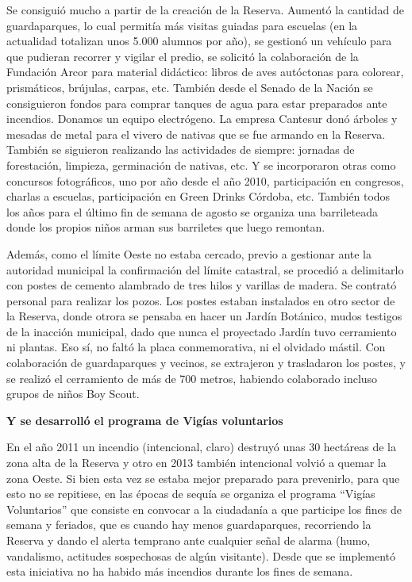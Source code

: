\begin{fullwidth}
Se consiguió mucho a partir de la creación de la Reserva. Aumentó la
cantidad de guardaparques, lo cual permitía más visitas guiadas para
escuelas (en la actualidad totalizan unos 5.000 alumnos por año), se
gestionó un vehículo para que pudieran recorrer y vigilar el predio, se
solicitó la colaboración de la Fundación Arcor para material didáctico:
libros de aves autóctonas para colorear, prismáticos, brújulas, carpas,
etc. También desde el Senado de la Nación se consiguieron fondos para
comprar tanques de agua para estar preparados ante incendios. Donamos un
equipo electrógeno. La empresa Cantesur donó árboles y mesadas de metal
para el vivero de nativas que se fue armando en la Reserva. También se
siguieron realizando las actividades de siempre: jornadas de
forestación, limpieza, germinación de nativas, etc. Y se incorporaron
otras como concursos fotográficos, uno por año desde el año 2010,
participación en congresos, charlas a escuelas, participación en Green
Drinks Córdoba, etc. También todos los años para el último fin de semana
de agosto se organiza una barrileteada donde los propios niños arman sus
barriletes que luego remontan.

Además, como el límite Oeste no estaba cercado, previo a gestionar ante
la autoridad municipal la confirmación del límite catastral, se procedió
a delimitarlo con postes de cemento alambrado de tres hilos y varillas
de madera. Se contrató personal para realizar los pozos. Los postes
estaban instalados en otro sector de la Reserva, donde otrora se pensaba
en hacer un Jardín Botánico, mudos testigos de la inacción municipal,
dado que nunca el proyectado Jardín tuvo cerramiento ni plantas. Eso sí,
no faltó la placa conmemorativa, ni el olvidado mástil. Con colaboración
de guardaparques y vecinos, se extrajeron y trasladaron los postes, y se
realizó el cerramiento de más de 700 metros, habiendo colaborado incluso
grupos de niños Boy Scout.

\textbf{Y se desarrolló el programa de Vigías voluntarios}

En el año 2011 un incendio (intencional, claro) destruyó unas 30
hectáreas de la zona alta de la Reserva y otro en 2013 también
intencional volvió a quemar la zona Oeste. Si bien esta vez se estaba
mejor preparado para prevenirlo, para que esto no se repitiese, en las
épocas de sequía se organiza el programa ``Vigías Voluntarios'' que
consiste en convocar a la ciudadanía a que participe los fines de semana
y feriados, que es cuando hay menos guardaparques, recorriendo la
Reserva y dando el alerta temprano ante cualquier señal de alarma (humo,
vandalismo, actitudes sospechosas de algún visitante). Desde que se
implementó esta iniciativa no ha habido más incendios durante los fines
de semana.


\end{fullwidth}
